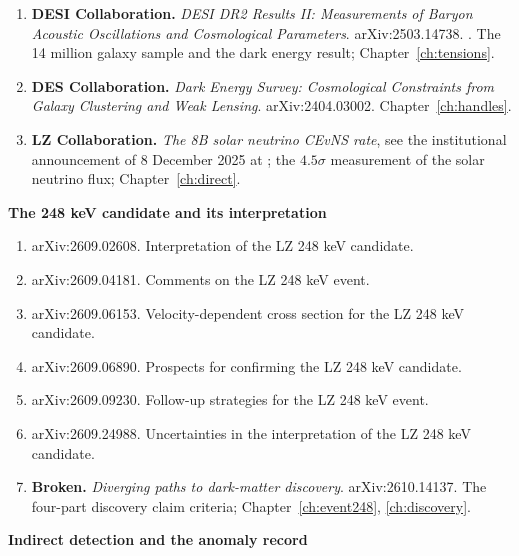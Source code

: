 \begin{enumerate}[leftmargin=1.4em,itemsep=4pt]
\item \textbf{DESI Collaboration.} \emph{DESI DR2 Results II: Measurements of
Baryon Acoustic Oscillations and Cosmological Parameters}. arXiv:2503.14738.
. The 14 million galaxy sample and the
dark energy result; Chapter~\ref{ch:tensions}.
\item \textbf{DES Collaboration.} \emph{Dark Energy Survey: Cosmological
Constraints from Galaxy Clustering and Weak Lensing}. arXiv:2404.03002.
Chapter~\ref{ch:handles}.
\item \textbf{LZ Collaboration.} \emph{The 8B solar neutrino CEvNS rate},
see the institutional announcement of 8 December 2025 at
; the $4.5\sigma$ measurement of the solar
neutrino flux; Chapter~\ref{ch:direct}.
\end{enumerate}

\vspace{8pt}
{\sffamily\bfseries\small The 248 keV candidate and its interpretation}

\begin{enumerate}[leftmargin=1.4em,itemsep=4pt,start=13]
\item arXiv:2609.02608. Interpretation of the LZ 248 keV candidate.
\item arXiv:2609.04181. Comments on the LZ 248 keV event.
\item arXiv:2609.06153. Velocity-dependent cross section for the LZ
248 keV candidate.
\item arXiv:2609.06890. Prospects for confirming the LZ 248 keV candidate.
\item arXiv:2609.09230. Follow-up strategies for the LZ 248 keV event.
\item arXiv:2609.24988. Uncertainties in the interpretation of the LZ
248 keV candidate.
\item \textbf{Broken.} \emph{Diverging paths to dark-matter discovery}.
arXiv:2610.14137. The four-part discovery claim criteria; Chapter~\ref{ch:event248},
\ref{ch:discovery}.
\end{enumerate}

\vspace{8pt}
{\sffamily\bfseries\small Indirect detection and the anomaly record}

